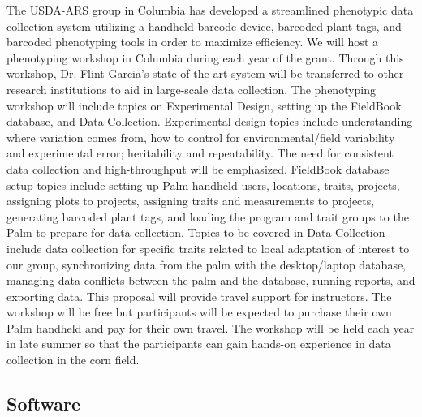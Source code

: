 The USDA-ARS group in Columbia has developed a streamlined phenotypic data collection system utilizing a handheld barcode device, barcoded plant tags, and barcoded phenotyping tools in order to maximize efficiency.  We will host a phenotyping workshop in Columbia during each year of the grant.  Through this workshop, Dr. Flint-Garcia’s state-of-the-art system will be transferred to other research institutions to aid in large-scale data collection. The phenotyping workshop will include topics on Experimental Design, setting up the FieldBook database, and Data Collection.  Experimental design topics include understanding where variation comes from, how to control for environmental/field variability and experimental error; heritability and repeatability.  The need for consistent data collection and high-throughput will be emphasized.  FieldBook database setup topics include setting up Palm handheld users, locations, traits, projects, assigning plots to projects, assigning traits and measurements to projects,  generating barcoded plant tags, and loading the program and trait groups to the Palm to prepare for data collection.  Topics to be covered in Data Collection include data collection for specific traits related to local adaptation of interest to our group, synchronizing data from the palm with the desktop/laptop database, managing data conflicts between the palm and the database, running reports, and exporting data.  This proposal will provide travel support for instructors.  The workshop will be free but participants will be expected to purchase their own Palm handheld and pay for their own travel.  The workshop will be held each year in late summer so that the participants can gain hands-on experience in data collection in the corn field.

\subsection*{Software} %

